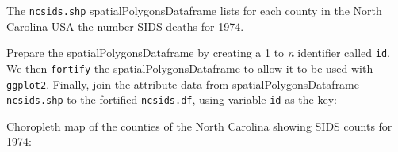 \documentclass[
]{article}
\newenvironment{Shaded}{\begin{snugshade}}{\end{snugshade}}
\newcommand{\DataTypeTok}[1]{\textcolor[rgb]{0.13,0.29,0.53}{#1}}
\newcommand{\DecValTok}[1]{\textcolor[rgb]{0.00,0.00,0.81}{#1}}
\newcommand{\KeywordTok}[1]{\textcolor[rgb]{0.13,0.29,0.53}{\textbf{#1}}}
\newcommand{\NormalTok}[1]{#1}
\newcommand{\OperatorTok}[1]{\textcolor[rgb]{0.81,0.36,0.00}{\textbf{#1}}}
\newcommand{\StringTok}[1]{\textcolor[rgb]{0.31,0.60,0.02}{#1}}
\begin{document}
The \texttt{ncsids.shp} spatialPolygonsDataframe lists for each county
in the North Carolina USA the number SIDS deaths for 1974.

Prepare the spatialPolygonsDataframe by creating a 1 to \emph{n}
identifier called \texttt{id}. We then \texttt{fortify} the
spatialPolygonsDataframe to allow it to be used with \texttt{ggplot2}.
Finally, join the attribute data from spatialPolygonsDataframe
\texttt{ncsids.shp} to the fortified \texttt{ncsids.df}, using variable
\texttt{id} as the key:

\begin{Shaded}
\end{Shaded}

Choropleth map of the counties of the North Carolina showing SIDS counts
for 1974:
\end{document}
